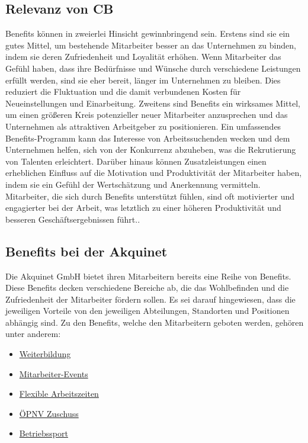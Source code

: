 \subsection{Relevanz von CB}
\label{sec:relevanz}
Benefits können in zweierlei Hinsicht gewinnbringend sein. Erstens sind sie ein gutes Mittel, um bestehende Mitarbeiter besser an das Unternehmen zu binden, indem sie deren Zufriedenheit und Loyalität erhöhen.\cite{werner2021strategic} Wenn Mitarbeiter das Gefühl haben, dass ihre Bedürfnisse und Wünsche durch verschiedene Leistungen erfüllt werden, sind sie eher bereit, länger im Unternehmen zu bleiben. Dies reduziert die Fluktuation und die damit verbundenen Kosten für Neueinstellungen und Einarbeitung. Zweitens sind Benefits ein wirksames Mittel, um einen größeren Kreis potenzieller neuer Mitarbeiter anzusprechen und das Unternehmen als attraktiven Arbeitgeber zu positionieren. Ein umfassendes Benefits-Programm kann das Interesse von Arbeitssuchenden wecken und dem Unternehmen helfen, sich von der Konkurrenz abzuheben, was die Rekrutierung von Talenten erleichtert.\cite{werner2021strategic} Darüber hinaus können Zusatzleistungen einen erheblichen Einfluss auf die Motivation und Produktivität der Mitarbeiter haben, indem sie ein Gefühl der Wertschätzung und Anerkennung vermitteln. Mitarbeiter, die sich durch Benefits unterstützt fühlen, sind oft motivierter und engagierter bei der Arbeit, was letztlich zu einer höheren Produktivität und besseren Geschäftsergebnissen führt.\cite{hong1995impact}.

\subsection{Benefits bei der Akquinet}
\label{sec:benefits}
Die Akquinet GmbH bietet ihren Mitarbeitern bereits eine Reihe von Benefits. Diese Benefits decken verschiedene Bereiche ab, die das Wohlbefinden und die Zufriedenheit der Mitarbeiter fördern sollen. Es sei darauf hingewiesen, dass die jeweiligen Vorteile von den jeweiligen Abteilungen, Standorten und Positionen abhängig sind.\cite{akquinetueberuns}\newline \newline
Zu den Benefits, welche den Mitarbeitern geboten werden, gehören unter anderem: \newline
\begin{itemize}
    \item \hyperref[sec:weiterbildung]{Weiterbildung}
    \item \hyperref[sec:mitarbeiterevents]{Mitarbeiter-Events}
    \item \hyperref[sec:felxarbeitszeiten]{Flexible Arbeitszeiten}
    \item \hyperref[sec:oepnvzuschuss]{ÖPNV Zuschuss}
    \item \hyperref[sec:betriebssport]{Betriebssport}
\end{itemize}
\cite{akquinetueberuns}

